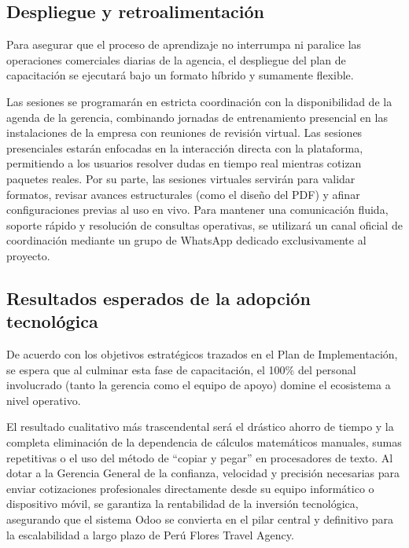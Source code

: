 \subsection{Despliegue y retroalimentación}
\begin{indentedsubsection}
Para asegurar que el proceso de aprendizaje no interrumpa ni paralice las operaciones comerciales diarias de la agencia, el despliegue del plan de capacitación se ejecutará bajo un formato híbrido y sumamente flexible.

Las sesiones se programarán en estricta coordinación con la disponibilidad de la agenda de la gerencia, combinando jornadas de entrenamiento presencial en las instalaciones de la empresa con reuniones de revisión virtual. Las sesiones presenciales estarán enfocadas en la interacción directa con la plataforma, permitiendo a los usuarios resolver dudas en tiempo real mientras cotizan paquetes reales. Por su parte, las sesiones virtuales servirán para validar formatos, revisar avances estructurales (como el diseño del PDF) y afinar configuraciones previas al uso en vivo. Para mantener una comunicación fluida, soporte rápido y resolución de consultas operativas, se utilizará un canal oficial de coordinación mediante un grupo de WhatsApp dedicado exclusivamente al proyecto.
\end{indentedsubsection}

\subsection{Resultados esperados de la adopción tecnológica}
\begin{indentedsubsection}
De acuerdo con los objetivos estratégicos trazados en el Plan de Implementación, se espera que al culminar esta fase de capacitación, el 100\% del personal involucrado (tanto la gerencia como el equipo de apoyo) domine el ecosistema a nivel operativo.

El resultado cualitativo más trascendental será el drástico ahorro de tiempo y la completa eliminación de la dependencia de cálculos matemáticos manuales, sumas repetitivas o el uso del método de ``copiar y pegar'' en procesadores de texto. Al dotar a la Gerencia General de la confianza, velocidad y precisión necesarias para enviar cotizaciones profesionales directamente desde su equipo informático o dispositivo móvil, se garantiza la rentabilidad de la inversión tecnológica, asegurando que el sistema Odoo se convierta en el pilar central y definitivo para la escalabilidad a largo plazo de Perú Flores Travel Agency.
\end{indentedsubsection}
